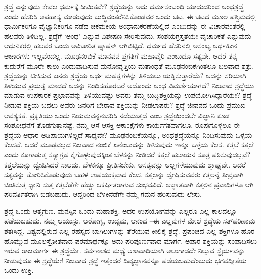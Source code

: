ಶ್ರದ್ಧೆ ಎನ್ನುವುದು ಕೇವಲ ಧರ್ಮಕ್ಕೆ ಸೀಮಿತವೇ? ಶ್ರದ್ಧೆಯನ್ನು ಅದು ಧರ್ಮಸಂಬಂಧಿ ಯಾದುದರಿಂದ ಅಂಧಶ್ರದ್ಧೆ ಎಂದು ಹೆಸರಿಸಿ ಅಪಹಾಸ್ಯ ಮಾಡುವುದು ಬುದ್ಧಿವಂತರೆನಿಸಿ\break ಕೊಂಡವರ ಒಂದು ಚಟ. ಈ ಚಟದ ಮೂಲ ಪಶ್ಚಿಮದಲ್ಲಿ ಧಾರ್ಮಿಕರಿಗೂ ವೈಜ್ಞಾನಿಕರಿಗೂ ನಡೆದ ಚಕಮಕಿಯ ಅಂಧಾನುಕರಣೆಯಲ್ಲಿದೆ ಎಂಬುದನ್ನು ಈ ವಿಚಾರವಂತರಲ್ಲಿ ಹಲವರು ತಿಳಿದಿಲ್ಲ. ಶ್ರದ್ಧೆಗೆ ‘ಅಂಧ’ ಎನ್ನುವ ವಿಶೇಷಣ ಸೇರಿಸುವುದು, ಸಂಶಯಗ್ರಸ್ತತೆಯೇ ವೈಚಾರಿಕತೆ ಎನ್ನುವುದು ಆಧುನಿಕರಲ್ಲಿ ಹಲವರ ಒಂದು ಅವಿಚಾರಿತ ಫ್ಯಾಷನ್ ಆಗಿಬಿಟ್ಟಿದೆ. ಧರ್ಮದ ಹೆಸರಿನಲ್ಲಿ ಅಸಂಖ್ಯ ಅರ್ಥಹೀನ ಆಚಾರಗಳು ಇಲ್ಲವೆಂದಲ್ಲ. ಮೂಢನಂಬಿಕೆ ಮಾನವನ ಪ್ರಗತಿಗೆ ಮಹಾವೈರಿ ಎಂಬುದೂ ಸತ್ಯವೇ. ಆದರೆ ತನ್ನ ಕುದುರೆಗೆ ಮೂರೇ ಕಾಲು ಎಂದುವಾದಿಸುವ ಮನೋವೃತ್ತಿಯ ಮತಾಂಧತೆ ಮೂಢನಂಬಿಕೆಗಿಂತಲೂ ಬಲವಾದ ಶತ್ರು. ಶ್ರದ್ಧೆಯನ್ನು ಟೀಕಿಸುವ ಜನರು ಶ್ರದ್ಧೆಯ ಅರ್ಥ ಮಹತ್ವಗಳನ್ನು ತಿಳಿಯಲು ಯತ್ನಿಸುತ್ತಾರೆಯೆ? ಅದನ್ನು ಸರಿಯಾಗಿ ತಿಳಿಯುವ ಪ್ರಯತ್ನ ಮಾಡದೆ ಅದನ್ನು ನಿಂದಿಸಹೊರಟರೆ ಅದೊಂದು ಅಂಧ ವಿಮರ್ಶೆಯಾಗದೆ? ನಿಜವಾದ ಶ್ರದ್ಧೆಯು ಮಾಡುವ ಉಪಕಾರಕ ಪ್ರಭಾವವನ್ನು ತಿಳಿಯುವಷ್ಟು ಅವರು ತಮ್ಮ ಬುದ್ಧಿಶಕ್ತಿಯನ್ನು ಉಪಯೋಗಿಸಿದ್ದಾರೆಯೇ? ಶ್ರದ್ಧೆ ನೀಡುವ ಶಕ್ತಿಯ ಬದಲು ಅವರು ಜನರಿಗೆ ಬೇರಾವ ಶಕ್ತಿಯನ್ನು ನೀಡಲಾಪರು? ಶ್ರದ್ಧೆ ಜೀವನದ ಒಂದು ಪ್ರಮುಖ ಆವಶ್ಯಕತೆ. ಪ್ರಕೃತಿಯು ಒಂದು ನಿಯಮವನ್ನನುಸರಿಸಿ ನಡೆಯುತ್ತದೆ ಎಂಬ ಶ್ರದ್ಧೆಯಿಂದಲೇ ವಿಜ್ಞಾನಿ ಕೂಡ ಸಂಶೋಧನೆಗೆ ತೊಡಗುತ್ತಾನಷ್ಟೆ. ನಮ್ಮ ಆಸೆ ಆಸಕ್ತಿ ಆಕಾಂಕ್ಷೆಗಳು ಕಾರ್ಯಗತವಾಗಲೂ, ರೂಪುಗೊಳ್ಳಲೂ ಈ ಶ್ರದ್ಧೆಯ ಆಧಾರ ಅಡಿಪಾಯಗಳಿಲ್ಲದೆ ಸಾಧ್ಯವೇ? ಮೂಢನಂಬಿಕೆಯನ್ನೂ, ಅಂಧಶ್ರದ್ಧೆಯನ್ನೂ ನಿಂದಿಸುವುದು ಒಳ್ಳೆಯ ಕೆಲಸವೆ. ಆದರೆ ಮೂಢವಲ್ಲದ ನಿಜವಾದ ನಂಬಿಕೆ ಏನೆಂಬುದನ್ನು ತಿಳಿಸುವುದು ಇನ್ನೂ ಒಳ್ಳೆಯ ಕೆಲಸ. ಕತ್ತಲೆ ಕತ್ತಲೆ ಎಂದು ಕೂಗಾಡುತ್ತ ಸತ್ಯಾಗ್ರಹ ಕೈಗೊಳ್ಳುವುದಕ್ಕಿಂತ ಬೆಳಕನ್ನು ನೀಡಿದರೆ ಕತ್ತಲೆ ಪಲಾಯನ ಸೂತ್ರ ಪಠಿಸುವುದಲ್ಲವೆ? ಕತ್ತಲೆಯನ್ನು ದ್ವೇಷಿಸಿದರೆ ಸಾಲದು. ಬೆಳಕನ್ನೂ ಪ್ರೀತಿಸಬೇಕು. ಅಸತ್ಯವನ್ನು ಅಲ್ಲಗಳೆಯುವುದು ಶ್ಲಾಘ್ಯವೇ. ಆದರೆ ಸತ್ಯವನ್ನು ತೋರಿಸಿಕೊಡುವುದು ಬಹಳ ಉಪಯುಕ್ತವಾದ ಕೆಲಸ. ಕತ್ತಲನ್ನು ದ್ವೇಷಿಸುವವರು ಕತ್ತಲನ್ನೆ ತೀವ್ರವಾಗಿ ಚಿಂತಿಸುತ್ತ ಧ್ಯಾನಿ ಸುತ್ತ ಕತ್ತಲೆಡೆಗೇ ಹೆಚ್ಚು ಆಕರ್ಷಿತರಾಗುವ ಸಂಭವವಿದೆ. ಅಜ್ಞಾತವಾಗಿ ಕತ್ತಲಿನ ಪ್ರವಾದಿಗಳೂ ಆಗಿ ಪರಿವರ್ತಿತರಾಗಿ ಬಿಡಬಹುದು. ಆದ್ದರಿಂದ ಬೆಳಕಿನೆಡೆಗೇ ನಮ್ಮ ಗಮನ ಹರಿಸುವುದು ಲೇಸು.

ಶ್ರದ್ಧೆ ಒಂದು ಆತ್ಮಗುಣ. ಮನಸ್ಸಿನ ಒಂದು ಮಹಾಶಕ್ತಿ. ಅದರ ಉಪಯೋಗವನ್ನು ಎಲ್ಲರೂ ಎಲ್ಲ ಕಾಲದಲ್ಲೂ ಪಡೆಯಬಹುದು. ನಮ್ಮ ಆಯುಸ್ಸು, ಆರೋಗ್ಯ, ಉದ್ಯಮ, ಆನಂದ –ಈ ಎಲ್ಲವುಗಳ ಮೇಲೆ ಶ್ರದ್ಧೆಯ ಸತ್​ಪರಿಣಾಮ ಶತಃಸಿದ್ಧ. ವಿಶ್ವದಲ್ಲಿರುವ ಎಲ್ಲ ರಹಸ್ಯದ ಬಾಗಿಲುಗಳನ್ನು ತೆರೆಯುವ ಕೀಲಿಕೈ ಶ್ರದ್ಧೆ. ಪ್ರಪಂಚದ ಎಲ್ಲ ಶಕ್ತಿಗಳೂ ಹೊರ ಹೊಮ್ಮುವ ಮೂಲಸ್ರೋತವಾದ ಪರಮಾರ್ಥಕ್ಕೂ ಅದು ಪರಿಪೂರ್ಣವಾದ ಮಾರ್ಗ. ಅಪಾರ ಶಕ್ತಿಯನ್ನು ಸಂಪಾದಿಸಲು ಇರುವ ರಾಜಮಾರ್ಗ ಈ ಶ್ರದ್ಧೆಯೇ. ಸರ್ವನಾಶದ ಮಧ್ಯೆ ಆಶಾವಾದಿಯಾಗಿ ಅಲುಗಾಡದೇ ನಿಲ್ಲುವ ಸ್ಥೈರ್ಯವನ್ನು ನೀಡುವುದೂ ಈ ಶ್ರದ್ಧೆಯೇ! ನಿಜವಾದ ಶ್ರದ್ಧೆ ಇತ್ತೆಂದರೆ ದಿವ್ಯಜ್ಞಾನವನ್ನೂ ಪಡೆಯಬಹುದೆಂಬುದು ಭಗವದ್ಗೀತೆಯ ಒಂದು ಉಕ್ತಿ.

